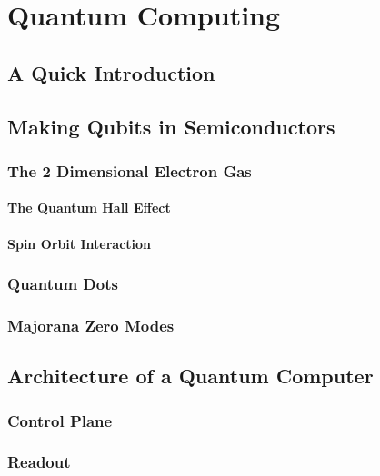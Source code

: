 \chapter{Quantum Computing}

\section{A Quick Introduction}

\section{Making Qubits in Semiconductors}
  \subsection{The 2 Dimensional Electron Gas}
  \subsubsection{The Quantum Hall Effect}
  \subsubsection{Spin Orbit Interaction}
  \subsection{Quantum Dots}
  \subsection{Majorana Zero Modes}

\section{Architecture of a Quantum Computer}
  \subsection{Control Plane}
  \subsection{Readout}